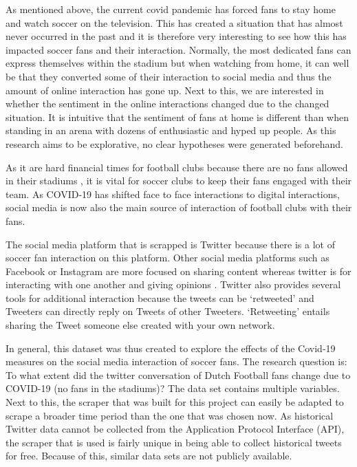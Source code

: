 \documentclass[12pt]{article}
\begin{document}
As mentioned above, the current covid pandemic has forced fans to stay home and watch soccer on the television. This has created a situation that has almost never occurred in the past and it is therefore very interesting to see how this has impacted soccer fans and their interaction. Normally, the most dedicated fans can express themselves within the stadium but when watching from home, it can well be that they converted some of their interaction to social media and thus the amount of online interaction has gone up. Next to this, we are interested in whether the sentiment in the online interactions changed due to the changed situation. It is intuitive that the sentiment of fans at home is different than when standing in an arena with dozens of enthusiastic and hyped up people. As this research aims to be explorative, no clear hypotheses were generated beforehand.

As it are hard financial times for football clubs because there are no fans allowed in their stadiums \citep{grix2020impact}, it is vital for soccer clubs to keep their fans engaged with their team. As COVID-19 has shifted face to face interactions to digital interactions, social media is now also the main source of interaction of football clubs with their fans.

The social media platform that is scrapped is Twitter because there is a lot of soccer fan interaction on this platform. Other social media platforms such as Facebook or Instagram are more focused on sharing content whereas twitter is for interacting with one another and giving opinions \citep{kassing2010fan}. Twitter also provides several tools for additional interaction because the tweets can be ‘retweeted’ and Tweeters can directly reply on Tweets of other Tweeters. ‘Retweeting’ entails sharing the Tweet someone else created with your own network.

In general, this dataset was thus created to explore the effects of the Covid-19 measures on the social media interaction of soccer fans. The research question is: To what extent did the twitter conversation of Dutch Football fans change due to COVID-19 (no fans in the stadiums)? The data set contains multiple variables. Next to this, the scraper that was built for this project can easily be adapted to scrape a broader time period than the one that was chosen now. As historical Twitter data cannot be collected from the Application Protocol Interface (API), the scraper that is used is fairly unique in being able to collect historical tweets for free. Because of this, similar data sets are not publicly available.
\end{document}
